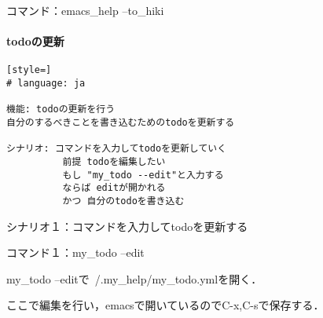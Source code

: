 コマンド：emacs\_help --to\_hiki

\paragraph{todoの更新}\begin{lstlisting}[style=]
# language: ja

機能: todoの更新を行う
自分のするべきことを書き込むためのtodoを更新する

シナリオ: コマンドを入力してtodoを更新していく
          前提 todoを編集したい
          もし "my_todo --edit"と入力する
          ならば editが開かれる
          かつ 自分のtodoを書き込む

\end{lstlisting}
シナリオ１：コマンドを入力してtodoを更新する

コマンド１：my\_todo --edit

my\_todo --editで~/.my\_help/my\_todo.ymlを開く．

ここで編集を行い，emacsで開いているのでC-x,C-sで保存する．

